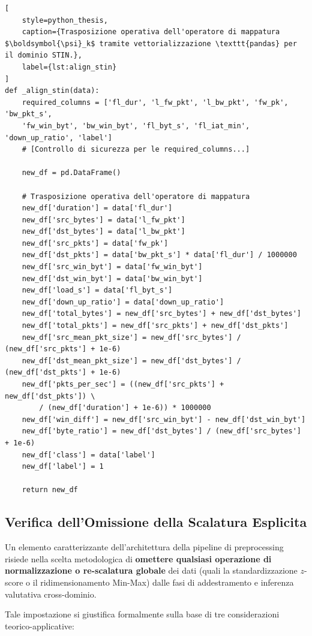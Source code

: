 \begin{lstlisting}[
    style=python_thesis,
    caption={Trasposizione operativa dell'operatore di mappatura $\boldsymbol{\psi}_k$ tramite vettorializzazione \texttt{pandas} per il dominio STIN.},
    label={lst:align_stin}
]
def _align_stin(data):
    required_columns = ['fl_dur', 'l_fw_pkt', 'l_bw_pkt', 'fw_pk', 'bw_pkt_s', 
    'fw_win_byt', 'bw_win_byt', 'fl_byt_s', 'fl_iat_min', 'down_up_ratio', 'label']
    # [Controllo di sicurezza per le required_columns...]

    new_df = pd.DataFrame()

    # Trasposizione operativa dell'operatore di mappatura
    new_df['duration'] = data['fl_dur']
    new_df['src_bytes'] = data['l_fw_pkt']
    new_df['dst_bytes'] = data['l_bw_pkt']
    new_df['src_pkts'] = data['fw_pk']
    new_df['dst_pkts'] = data['bw_pkt_s'] * data['fl_dur'] / 1000000
    new_df['src_win_byt'] = data['fw_win_byt']
    new_df['dst_win_byt'] = data['bw_win_byt']
    new_df['load_s'] = data['fl_byt_s']
    new_df['down_up_ratio'] = data['down_up_ratio']
    new_df['total_bytes'] = new_df['src_bytes'] + new_df['dst_bytes']
    new_df['total_pkts'] = new_df['src_pkts'] + new_df['dst_pkts']
    new_df['src_mean_pkt_size'] = new_df['src_bytes'] / (new_df['src_pkts'] + 1e-6)
    new_df['dst_mean_pkt_size'] = new_df['dst_bytes'] / (new_df['dst_pkts'] + 1e-6)
    new_df['pkts_per_sec'] = ((new_df['src_pkts'] + new_df['dst_pkts']) \
        / (new_df['duration'] + 1e-6)) * 1000000
    new_df['win_diff'] = new_df['src_win_byt'] - new_df['dst_win_byt']
    new_df['byte_ratio'] = new_df['dst_bytes'] / (new_df['src_bytes'] + 1e-6)
    new_df['class'] = data['label']
    new_df['label'] = 1

    return new_df
\end{lstlisting}


\subsection{Verifica dell'Omissione della Scalatura Esplicita}
\label{subsec:verifica_no_scaling}

Un elemento caratterizzante dell'architettura della pipeline di preprocessing risiede nella scelta metodologica di \textbf{omettere qualsiasi operazione di normalizzazione o re-scalatura globale} dei dati (quali la standardizzazione $z$-score o il ridimensionamento Min-Max) dalle fasi di addestramento e inferenza valutativa cross-dominio.

Tale impostazione si giustifica formalmente sulla base di tre considerazioni teorico-applicative:

